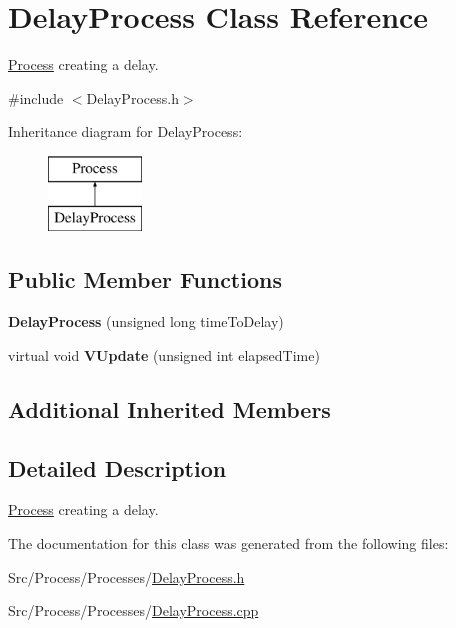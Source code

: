 \hypertarget{classDelayProcess}{\section{Delay\-Process Class Reference}
\label{classDelayProcess}
}


\hyperlink{classProcess}{Process} creating a delay.  




{\ttfamily \#include $<$Delay\-Process.\-h$>$}

Inheritance diagram for Delay\-Process\-:\begin{figure}[H]
\begin{center}
\leavevmode
\includegraphics[height=2.000000cm]{classDelayProcess}
\end{center}
\end{figure}
\subsection*{Public Member Functions}
\begin{DoxyCompactItemize}
\item 
\hypertarget{classDelayProcess_a96fc235a7882b0303581b1738d2b5e1a}{{\bfseries Delay\-Process} (unsigned long time\-To\-Delay)}\label{classDelayProcess_a96fc235a7882b0303581b1738d2b5e1a}

\item 
\hypertarget{classDelayProcess_adfdee65c7d8eb6fe45ee7ee8260a87cf}{virtual void {\bfseries V\-Update} (unsigned int elapsed\-Time)}\label{classDelayProcess_adfdee65c7d8eb6fe45ee7ee8260a87cf}

\end{DoxyCompactItemize}
\subsection*{Additional Inherited Members}


\subsection{Detailed Description}
\hyperlink{classProcess}{Process} creating a delay. 

The documentation for this class was generated from the following files\-:\begin{DoxyCompactItemize}
\item 
Src/\-Process/\-Processes/\hyperlink{DelayProcess_8h}{Delay\-Process.\-h}\item 
Src/\-Process/\-Processes/\hyperlink{DelayProcess_8cpp}{Delay\-Process.\-cpp}\end{DoxyCompactItemize}
